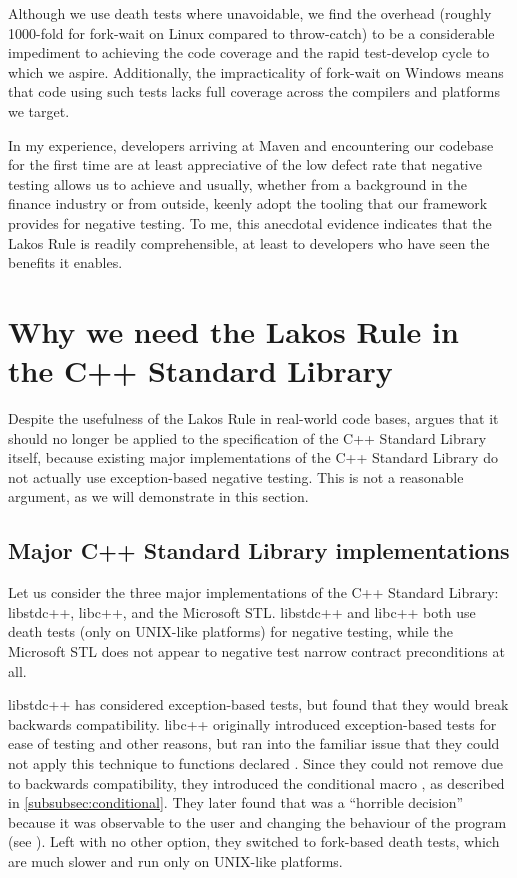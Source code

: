 Although we use death tests where unavoidable, we find the overhead (roughly 1000-fold for fork-wait on Linux compared to throw-catch) to be a considerable impediment to achieving the code coverage and the rapid test-develop cycle to which we aspire. Additionally, the impracticality of fork-wait on Windows means that code using such tests lacks full coverage across the compilers and platforms we target.

In my experience, developers arriving at Maven and encountering our codebase for the first time are at least appreciative of the low defect rate that negative testing allows us to achieve and usually, whether from a background in the finance industry or from outside, keenly adopt the tooling that our framework provides for negative testing. To me, this anecdotal evidence indicates that the Lakos Rule is readily comprehensible, at least to developers who have seen the benefits it enables.

\section{Why we need the Lakos Rule in the C++ Standard Library}
\label{sec:stdlib}

Despite the usefulness of the Lakos Rule in real-world code bases, \cite{P1656R2} argues that it should no longer be applied to the specification of the C++ Standard Library itself, because existing major implementations of the C++ Standard Library do not actually use exception-based negative testing. This is not a reasonable argument, as we will demonstrate in this section.

\subsection{Major C++ Standard Library implementations}
\label{subsec:major}

Let us consider the three major implementations of the C++ Standard Library: libstdc++, libc++, and the Microsoft STL. libstdc++ and libc++ both use death tests (only on UNIX-like platforms) for negative testing, while the Microsoft STL does not appear to negative test narrow contract preconditions at all.

libstdc++ has considered exception-based tests, but found that they would break backwards compatibility. libc++ originally introduced exception-based tests for ease of testing and other reasons, but ran into the familiar issue that they could not apply this technique to functions declared . Since they could not remove  due to backwards compatibility, they introduced the conditional  macro  , as described in \ref{subsubsec:conditional}. They later found that  was a ``horrible decision'' because  it was observable to the user and changing the behaviour of the program (see \cite{LLVMReviewD59166}). Left with no other option, they switched to fork-based death tests, which are much slower and run only on UNIX-like platforms.


